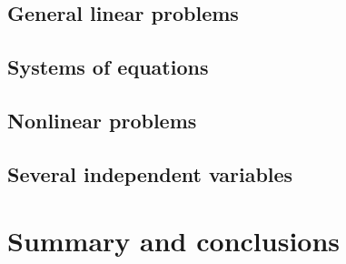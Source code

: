 \subsection{General linear problems}

\subsection{Systems of equations}

\subsection{Nonlinear problems}

\subsection{Several independent variables}

\section{Summary and conclusions}